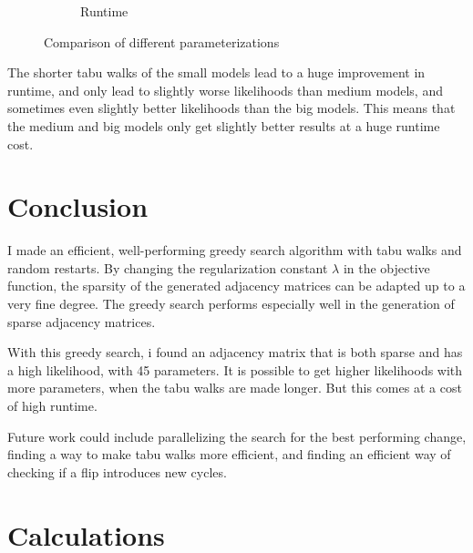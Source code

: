 \documentclass[sigconf, fleqn, prologue, dvipsnames]{acmart}
\def\ndy{%
    \reversemarginpar%
    \marginpar{\raggedleft\textcolor{red}{\rule{2mm}{2mm}}}%
}
\begin{document}
\begin{figure}
\begin{subfigure}{0.2\textwidth}
		\caption{Runtime}
		\label{fig:results:smaller:times}
	\end{subfigure}
	\caption{Comparison of different parameterizations}
	\label{fig:results:smaller:parameterizations}
\end{figure}

The shorter tabu walks of the small models lead to a huge improvement in runtime, and only lead to slightly worse likelihoods than medium models, and sometimes even slightly better likelihoods than the big models.
This means that the medium and big models only get slightly better results at a huge runtime cost.


\section{Conclusion}
I made an efficient, well-performing greedy search algorithm with tabu walks and random restarts.
By changing the regularization constant $\lambda$ in the objective function, the sparsity of the generated adjacency matrices can be adapted up to a very fine degree.
The greedy search performs especially well in the generation of sparse adjacency matrices.

With this greedy search, i found an adjacency matrix that is both sparse and has a high likelihood, with 45 parameters.
It is possible to get higher likelihoods with more parameters, when the tabu walks are made longer. But this comes at a cost of high runtime.

Future work could include parallelizing the search for the best performing change, finding a way to make tabu walks more efficient, and finding an efficient way of checking if a flip introduces new cycles.

\typeout{}

\ndy


\clearpage
\appendix
\section{Calculations}
\end{document}

